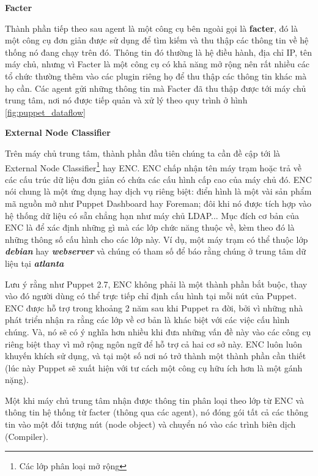 \textbf{\large Facter}


Thành phần tiếp theo sau agent là một công cụ bên ngoài gọi là \textbf{\textbf{facter}}, đó là một công cụ đơn giản được sử dụng để tìm kiếm và thu thập các thông tin về hệ thống nó đang chạy trên đó. Thông tin đó thường là hệ điều hành, địa chỉ IP, tên máy chủ, nhưng vì Facter là một công cụ có khả năng mở rộng nên rất nhiều các tổ chức thường thêm vào các plugin riêng họ để thu thập các thông tin khác mà họ cần. Các agent gửi những thông tin mà Facter đã thu thập được tới máy chủ trung tâm, nơi nó được tiếp quản và xử lý theo quy trình ở hình \ref{fig:puppet_dataflow}

\newpage
\clearpage

\textbf{\large External Node Classifier}


Trên máy chủ trung tâm, thành phần đầu tiên chúng ta cần đề cập tới là External Node Classifier\footnote{Các lớp phân loại mở rộng} hay ENC. ENC chấp nhận tên máy trạm hoặc trả về các cấu trúc dữ liệu đơn giản có chứa các cấu hình cấp cao của máy chủ đó. ENC nói chung là một ứng dụng hay dịch vụ riêng biệt: điển hình là một vài sản phẩm mã nguồn mở như Puppet Dashboard hay Foreman; đôi khi nó được tích hợp vào hệ thống dữ liệu có sẵn chẳng hạn như máy chủ LDAP... Mục đích cơ bản của ENC là để xác định những gì mà các lớp chức năng thuộc về, kèm theo đó là những thông số cấu hình cho các lớp này. Ví dụ, một máy trạm có thể thuộc lớp \textbf{\textit{debian}} hay \textbf{\textit{webserver}} và chúng có tham số để báo rằng chúng ở trung tâm dữ liệu tại \textbf{\textit{atlanta}}

Lưu ý rằng như Puppet 2.7, ENC không phải là một thành phần bắt buộc, thay vào đó người dùng có thể trực tiếp chỉ định cấu hình tại mỗi nút của Puppet. ENC được hỗ trợ trong khoảng 2 năm sau khi Puppet ra đời, bởi vì những nhà phát triển nhận ra rằng các lớp về cơ bản là khác biệt với các việc cấu hình chúng. Và, nó sẽ có ý nghĩa hơn nhiều khi đưa những vấn đề này vào các công cụ riêng biệt thay vì mở rộng ngôn ngữ để hỗ trợ cả hai cơ sở này. ENC luôn luôn khuyến khích sử dụng, và tại một số nơi nó trở thành một thành phần cần thiết (lúc này Puppet sẽ xuất hiện với tư cách một công cụ hữu ích hơn là một gánh nặng).

Một khi máy chủ trung tâm nhận được thông tin phân loại theo lớp từ ENC và thông tin hệ thống từ facter (thông qua các agent), nó đóng gói tất cả các thông tin vào một đối tượng nút (node object) và chuyển nó vào các trình biên dịch (Compiler).

